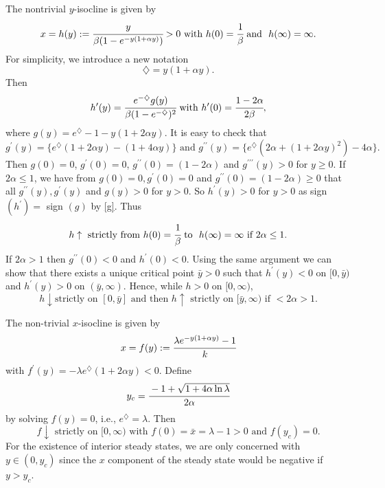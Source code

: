 \documentclass[11pt]{article}
\begin{document}
The nontrivial $y$-isocline is given by
\begin{equation}\label{h}
x=h(y):=\cfrac{y}{\beta(1-e^{-y(1+\alpha y)})} >0 \mbox{ with }
h(0)=\cfrac{1}{\beta } \mbox{ and }  \ h(\infty)=\infty.
\end{equation}
For simplicity, we introduce a new notation
\begin{equation}\label{sym}
\diamondsuit=y(1+\alpha y).
\end{equation}
Then
\begin{equation}\label{g}
h^\prime(y)=\cfrac{e^{-\diamondsuit}
g(y)}{\beta(1-e^{-\diamondsuit })^2}  \mbox{ with }
h^\prime(0)=\cfrac{1-2\alpha}{2 \beta },
\end{equation}
where $g(y)=e^{\diamondsuit}-1-y(1+2\alpha y)$. It is easy to
check that
$$
 g^{\prime}(y)= \{e^{\diamondsuit}(1+2\alpha y)-(1+4\alpha y) \} \mbox{ and }
  g^{\prime\prime}(y)=\{ e^{\diamondsuit}(2\alpha+ (1+2\alpha y)^2)-4\alpha \}.
 $$
 Then $ g(0)=0$, $ g^\prime(0)=0$,
 $  g^{\prime\prime}(0)=(1-2\alpha)$ and  $ g^{\prime\prime\prime}(y)>0$ for $y\geq 0$.
 If $2\alpha\leq 1$, we have from $ g(0)=0, g^\prime(0)=0$ and  $  g^{\prime\prime}(0)=(1-2\alpha) \geq 0 $
 that  all $g^{\prime\prime}(y), g^{\prime}(y) $ and $g(y)>0$ for $y>0$.  So $h^\prime(y)>0$ for $y>0$ as sign $(h^\prime) =$ sign $(  g)$ by \eqref{g}. Thus
\begin{equation}\label{monotone h}
h \uparrow \mbox { strictly from } h(0)=\cfrac{1}{\beta }  \mbox{
to } \ h(\infty)=\infty   \mbox{  if }  2\alpha\leq 1.
\end{equation}
If $2\alpha>1$ then $ g^{\prime\prime}(0)<0$ and
$h^{\prime}(0)<0$. Using the same argument we can show that there
exists a unique critical point $\bar y>0$ such that
$h^\prime(y)<0$ on $[0, \bar y)$ and $h^\prime(y)>0$ on $(\bar y,
\infty)$. Hence, while $h>0$ on $[0, \infty)$,
\begin{equation}\label{nonmonotone h}
h \downarrow \mbox {strictly  on } [0,  \bar y]  \mbox{ and then }
h \uparrow  \mbox { strictly on }  [\bar y, \infty) \mbox{ if } <
2\alpha>1.
\end{equation}

The non-trivial $x$-isocline is given by
\begin{equation}\label{f}
x=f(y):=\cfrac{\lambda e^{-y(1+\alpha y)}-1}{k}
\end{equation}
with $ f^\prime(y)=-\lambda e^{\diamondsuit}(1+2\alpha y)<0$.
Define
\begin{equation}\label{y_c}
y_c=\cfrac{-1+\sqrt{1+4\alpha\ln\lambda}}{2\alpha}
\end{equation}
by solving $f(y)=0$, i.e., $e^{\diamondsuit}=\lambda$. Then
\begin{equation}\label{monotone f}
  f \downarrow \mbox { strictly on } [0,  \infty) \mbox{ with } f(0)=\bar x=\lambda-1>0   \mbox{ and } f(y_c)=0.
\end{equation}
For the existence of interior steady states, we are only concerned
with $y \in (0,y_c)$ since the $x$ component of the steady state
would be negative if $y>y_c$.
\end{document}
